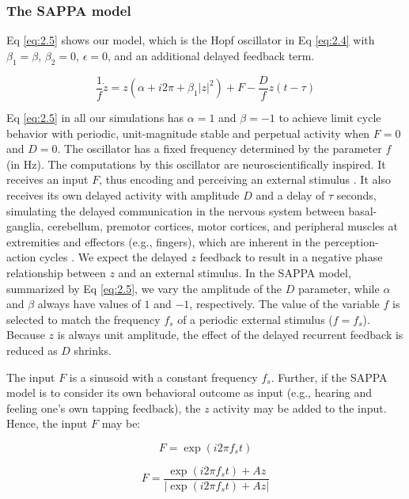 \documentclass{report}
\begin{document}
\subsubsection{The SAPPA model}

Eq \eqref{eq:2.5} shows our model, which is the Hopf oscillator in Eq \eqref{eq:2.4} with $\beta_1 = \beta$, $\beta_2=0$, $\epsilon=0$, and an additional delayed feedback term. 

\begin{equation}
\frac{1}{f}\dot{z} = z(\alpha + i2\pi + \beta_1|z|^2) + F - \frac{D}{f}z(t-\tau) \label{eq:2.5}
\end{equation}

Eq \eqref{eq:2.5} in all our simulations has $\alpha=1$ and $\beta=-1$ to achieve limit cycle behavior with periodic, unit-magnitude stable and perpetual activity when $F = 0$ and $D = 0$. The oscillator has a fixed frequency determined by the parameter $f$ (in Hz). The computations by this oscillator are neuroscientifically inspired. It receives an input $F$, thus encoding and perceiving an external stimulus \cite{large2015neural}. It also receives its own delayed activity with amplitude $D$ and a delay of $\tau$ seconds, simulating the delayed communication in the nervous system between basal-ganglia, cerebellum, premotor cortices, motor cortices, and peripheral muscles at extremities and effectors (e.g., fingers), which are inherent in the perception-action cycles \cite{aschersleben1995synchronizing, prinz1992don}. We expect the delayed $z$ feedback to result in a negative phase relationship between $z$ and an external stimulus. In the SAPPA model, summarized by Eq \eqref{eq:2.5}, we vary the amplitude of the $D$ parameter, while $\alpha$ and $\beta$ always have values of $1$ and $-1$, respectively. The value of the variable $f$ is selected to match the frequency $f_s$ of a periodic external stimulus ($f = f_s$). Because $z$ is always unit amplitude, the effect of the delayed recurrent feedback is reduced as $D$ shrinks.

The input $F$ is a sinusoid with a constant frequency $f_s$. Further, if the SAPPA model is to consider its own behavioral outcome as input (e.g., hearing and feeling one’s own tapping feedback), the $z$ activity may be added to the input. Hence, the input $F$ may be: 

\begin{equation}
F = \exp(i2\pi f_s t) \label{eq:2.6}
\end{equation}

\begin{equation}
F = \frac{\exp(i2\pi f_s t)+Az}{|\exp(i2\pi f_s t)+Az|} \label{eq:2.7}
\end{equation}
\end{document}
